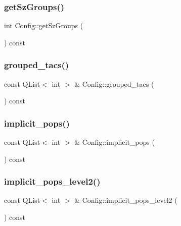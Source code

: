 \mbox{\label{class_config_a9f5e6aa3773ebdfdd05d0d042731565e}} 
\subsubsection{\texorpdfstring{getSzGroups()}{getSzGroups()}}
{\footnotesize\ttfamily int Config\+::get\+Sz\+Groups (\begin{DoxyParamCaption}{ }\end{DoxyParamCaption}) const}

\mbox{\label{class_config_a6627eb314eacce2817c04811826a3a65}} 
\subsubsection{\texorpdfstring{grouped\_tacs()}{grouped\_tacs()}}
{\footnotesize\ttfamily const Q\+List$<$ int $>$ \& Config\+::grouped\+\_\+tacs (\begin{DoxyParamCaption}{ }\end{DoxyParamCaption}) const}

\mbox{\label{class_config_a8f3b135cd618bfec4f380e04bef5f787}} 
\subsubsection{\texorpdfstring{implicit\_pops()}{implicit\_pops()}}
{\footnotesize\ttfamily const Q\+List$<$ int $>$ \& Config\+::implicit\+\_\+pops (\begin{DoxyParamCaption}{ }\end{DoxyParamCaption}) const}

\mbox{\label{class_config_a1de9a380a6c5a19fa2973cd1e786ba45}} 
\subsubsection{\texorpdfstring{implicit\_pops\_level2()}{implicit\_pops\_level2()}}
{\footnotesize\ttfamily const Q\+List$<$ int $>$ \& Config\+::implicit\+\_\+pops\+\_\+level2 (\begin{DoxyParamCaption}{ }\end{DoxyParamCaption}) const}

